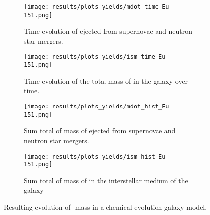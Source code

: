 \setlength{\subfigwidth}{0.5\textwidth}
\begin{figure}
  \begin{subfigure}{\subfigwidth}
    \centering
    \texttt{[image: results/plots\_yields/mdot\_time\_Eu-151.png]}
    \caption{Time evolution of  ejected from supernovae and neutron star mergers.}
  \end{subfigure}
  \begin{subfigure}{\subfigwidth}
    \centering
    \texttt{[image: results/plots\_yields/ism\_time\_Eu-151.png]}
    \caption{Time evolution of the total mass of  in the galaxy over time.}
  \end{subfigure}
  \begin{subfigure}{\subfigwidth}
    \centering
    \texttt{[image: results/plots\_yields/mdot\_hist\_Eu-151.png]}
    \caption{Sum total of mass of  ejected from supernovae and neutron star mergers.}
  \end{subfigure}
  \begin{subfigure}{\subfigwidth}
    \centering
    \texttt{[image: results/plots\_yields/ism\_hist\_Eu-151.png]}
    \caption{Sum total of mass of  in the interstellar medium of the galaxy}
  \end{subfigure}
  \caption{Resulting evolution of -mass in a chemical evolution galaxy model.}
\end{figure}
\begin{table}
  
\end{table}

